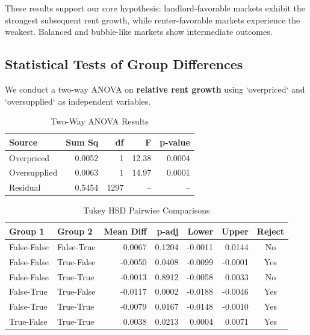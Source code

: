 \documentclass[sn-mathphys-num]{sn-jnl}%
\begin{document}
These results support our core hypothesis: landlord-favorable markets exhibit the strongest subsequent rent growth, while renter-favorable markets experience the weakest. Balanced and bubble-like markets show intermediate outcomes.

\subsection*{Statistical Tests of Group Differences}

We conduct a two-way ANOVA on \textbf{relative rent growth} using `overpriced` and `oversupplied` as independent variables.

\begin{table}[h!]
	\centering
	\caption*{Two-Way ANOVA Results}
	\label{tab:anova_results}
	\begin{tabular}{lrrrr}
		\toprule
		\textbf{Source} & \textbf{Sum Sq} & \textbf{df} & \textbf{F} & \textbf{p-value} \\
		\midrule
		Overpriced     & 0.0052 & 1     & 12.38 & 0.0004 \\
		Oversupplied   & 0.0063 & 1     & 14.97 & 0.0001 \\
		Residual       & 0.5454 & 1297  & --    & --     \\
		\bottomrule
	\end{tabular}
\end{table}

\begin{table}[h!]
	\centering
	\caption*{Tukey HSD Pairwise Comparisons}
	\label{tab:tukey_results}
	\begin{tabular}{llrrrrc}
		\toprule
		\textbf{Group 1} & \textbf{Group 2} & \textbf{Mean Diff} & \textbf{p-adj} & \textbf{Lower} & \textbf{Upper} & \textbf{Reject} \\
		\midrule
		False-False & False-True  &  0.0067 & 0.1204 & -0.0011 &  0.0144 & No \\
		False-False & True-False  & -0.0050 & 0.0408 & -0.0099 & -0.0001 & Yes \\
		False-False & True-True   & -0.0013 & 0.8912 & -0.0058 &  0.0033 & No \\
		False-True  & True-False  & -0.0117 & 0.0002 & -0.0188 & -0.0046 & Yes \\
		False-True  & True-True   & -0.0079 & 0.0167 & -0.0148 & -0.0010 & Yes \\
		True-False  & True-True   &  0.0038 & 0.0213 &  0.0004 &  0.0071 & Yes \\
		\bottomrule
	\end{tabular}
\end{table}
\end{document}
